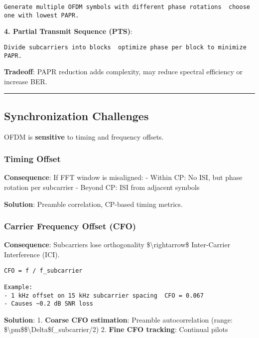 \begin{verbatim}
Generate multiple OFDM symbols with different phase rotations  choose one with lowest PAPR.
\end{verbatim}

\textbf{4. Partial Transmit Sequence (PTS)}:

\begin{verbatim}
Divide subcarriers into blocks  optimize phase per block to minimize PAPR.
\end{verbatim}

\textbf{Tradeoff}: PAPR reduction adds complexity, may reduce spectral
efficiency or increase BER.

\begin{center}\rule{0.5\linewidth}{0.5pt}\end{center}

\subsection{\texorpdfstring{ Synchronization
Challenges}{ Synchronization Challenges}}\label{synchronization-challenges}

OFDM is \textbf{sensitive} to timing and frequency offsets.

\subsubsection{Timing Offset}\label{timing-offset}

\textbf{Consequence}: If FFT window is misaligned: - Within CP: No ISI,
but phase rotation per subcarrier - Beyond CP: ISI from adjacent symbols

\textbf{Solution}: Preamble correlation, CP-based timing metrics.

\subsubsection{Carrier Frequency Offset
(CFO)}\label{carrier-frequency-offset-cfo}

\textbf{Consequence}: Subcarriers lose orthogonality
\$\textbackslash rightarrow\$ Inter-Carrier Interference (ICI).

\begin{verbatim}
CFO = f / f_subcarrier

Example:
- 1 kHz offset on 15 kHz subcarrier spacing  CFO = 0.067
- Causes ~0.2 dB SNR loss
\end{verbatim}

\textbf{Solution}: 1. \textbf{Coarse CFO estimation}: Preamble
autocorrelation (range:
\$\textbackslash pm\$\$\textbackslash Delta\$f\_subcarrier/2) 2.
\textbf{Fine CFO tracking}: Continual pilots

